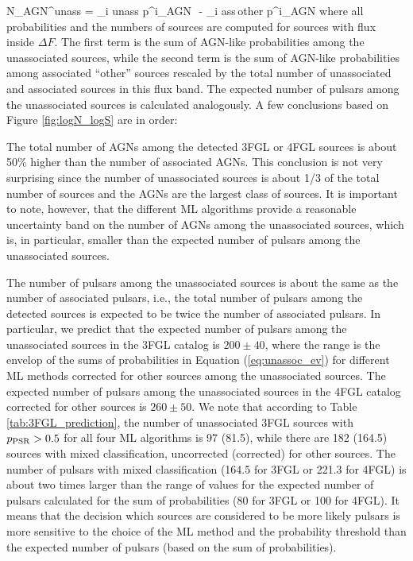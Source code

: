 \be
{}
N_{\rm AGN}^{\rm unass} = \sum_{i \in \rm unass} p^i_{\rm AGN}\,\, - \sum_{i \in \rm ass\,other} p^i_{\rm AGN} \cdot 
{}
\ee
where all probabilities and the numbers of sources are computed for sources with flux inside $\Delta F$.
The first term is the sum of AGN-like probabilities among the unassociated sources,
while the second term is the sum of AGN-like probabilities among associated ``other'' sources rescaled by the total number
of unassociated and associated sources in this flux band.
The expected number of pulsars among the unassociated sources is calculated analogously.
A few conclusions based on Figure \ref{fig:logN_logS} are in order:
\ben
\item
The total number of AGNs among the detected 3FGL or 4FGL sources is about 50\% higher than the number of associated AGNs.
This conclusion is not very surprising since the number of unassociated sources is about 1/3 of the total number of sources and the 
AGNs are the largest class of sources. It is important to note, however, that the different ML algorithms provide a reasonable uncertainty band on the number of AGNs among the unassociated sources, which is, in particular, smaller than the expected number of pulsars among the unassociated sources.
\item
The number of pulsars among the unassociated sources is about the same as the number of associated pulsars, i.e., the total number of pulsars among the detected sources is expected to be twice the number of associated pulsars.
\een
In particular, we predict that the expected number of pulsars among the unassociated sources in the 3FGL catalog
is $200 \pm 40$, where the range is the envelop of the sums of probabilities in Equation (\ref{eq:unassoc_ev})
for different ML methods corrected for other sources among the unassociated sources.
The expected number of pulsars among the unassociated sources in the 4FGL catalog corrected for other sources is $260 \pm 50$.
We note that according to Table \ref{tab:3FGL_prediction}, the number of unassociated 3FGL sources 
with $p_{\rm PSR} > 0.5$ for all four ML algorithms is 97 (81.5), while there are 182 (164.5) sources with mixed classification,
uncorrected (corrected) for other sources.
The number of pulsars with mixed classification (164.5 for 3FGL or 221.3 for 4FGL)
is about two times larger than the range of values for the expected number of pulsars calculated for the sum of probabilities 
(80 for 3FGL or 100 for 4FGL).
It means that the decision which sources are considered to be more likely pulsars is more sensitive to the choice of the ML method
and the probability threshold than the expected number of pulsars (based on the sum of probabilities).

